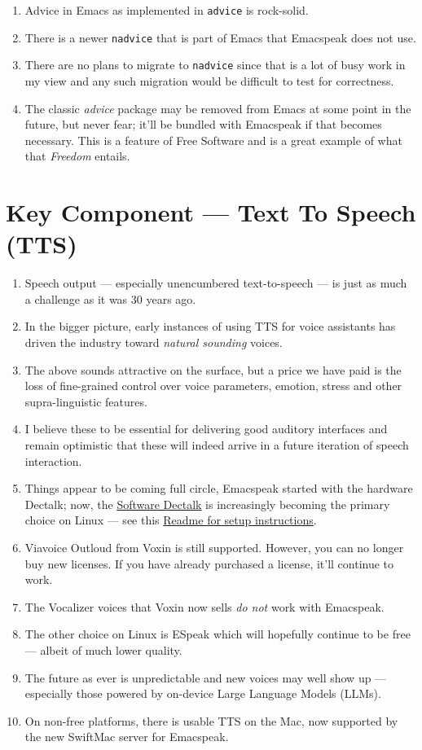 \documentclass[11pt]{article}
\begin{document}
\begin{enumerate}
\item Advice in Emacs as implemented in \texttt{advice} is rock-solid.
\item There is a newer \texttt{nadvice} that is part of Emacs that Emacspeak
does not use.

\item There are no plans to migrate to \texttt{nadvice} since that is a lot of
busy work in my view and any such migration would be difficult
to test for correctness.
\item The classic \emph{advice} package may be removed from Emacs at some
point in the future, but never fear; it'll be bundled with
Emacspeak if that becomes necessary. This is a feature of Free Software and is a great
example of what that \emph{Freedom} entails.
\end{enumerate}
\section{Key Component —  Text To Speech (TTS)}
\label{sec:org8aca920}

\begin{enumerate}
\item Speech output --- especially unencumbered text-to-speech --- is just
as much a challenge as it was 30 years ago.
\item In the bigger picture, early instances of using TTS for voice
assistants has driven the industry toward \emph{natural sounding} voices.
\item The above sounds attractive on the surface, but a price we have
paid is the  loss of fine-grained control over voice parameters,
emotion, stress and other supra-linguistic features.
\item I  believe  these to be essential for delivering
good auditory interfaces and   remain optimistic that
these will indeed arrive in a future iteration of speech
interaction.
\item Things appear to be coming full circle, Emacspeak started with
the hardware Dectalk; now, the \href{https://github.com/dectalk/dectalk.git}{Software Dectalk} is increasingly
becoming the primary choice on Linux --- see this  \href{https://raw.githubusercontent.com/tvraman/emacspeak/master/servers/software-dtk/Readme.org}{Readme for setup instructions}.
\item Viavoice Outloud from Voxin is still supported.  However,
you can no longer buy new licenses. If you have already purchased
a license, it'll
continue to work.
\item The  Vocalizer voices that Voxin now sells \emph{do not} work with Emacspeak.
\item The  other choice on Linux is ESpeak which will hopefully
continue to be free --- albeit of much lower quality.
\item The future as ever is unpredictable and new voices may well show
up --- especially those powered by on-device Large Language
Models (LLMs).

\item On non-free platforms, there is usable TTS on the Mac, now
supported by the new SwiftMac server for Emacspeak.
\end{enumerate}
\end{document}
